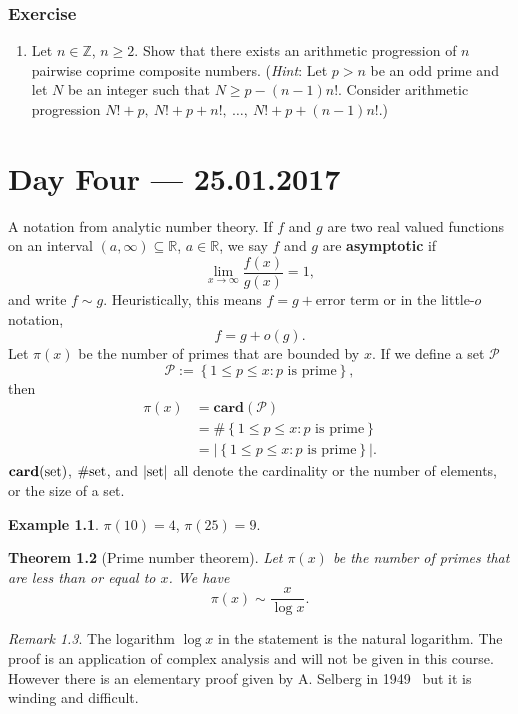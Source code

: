 \documentclass{amsbook}
\theoremstyle{plain}
\newtheorem{theorem}{Theorem}[chapter] %
\theoremstyle{definition}
\newtheorem{example}[theorem]{Example}
\theoremstyle{remark}
\newtheorem{remark}[theorem]{Remark}
\numberwithin{equation}{chapter}
\numberwithin{figure}{chapter}
\newcommand{\Z}{\mathbb{Z}}
\begin{document}
\subsection*{Exercise}
\begin{enumerate}
\item Let $n \in \Z$, $n \geqslant 2$. Show that there exists an arithmetic progression of $n$ pairwise coprime composite numbers. (\emph{Hint}: Let $p > n$ be an odd prime and let $N$ be an integer such that $N \geqslant p - (n-1)n!$. Consider arithmetic progression $N!+p, ~ N!+p+n!, ~\ldots, ~ N!+p+(n-1)n!$.)
\end{enumerate}

\chapter[Lecture Four]{Day Four \hfill {\footnotesize \rm --- 25.01.2017}}\label{chp:prime_num_theorem_gcd}

A notation from analytic number theory. If $f$ and $g$ are two real valued functions on an interval $(a, \infty) \subseteq \mathbb{R}$, $a \in \mathbb{R}$, we say $f$ and $g$ are \textbf{asymptotic} if 
\[
\lim_{x \to \infty} \frac{f(x)}{g(x)} = 1,
\]
and write $f \sim g$. Heuristically, this means $f = g + \text{error term}$ or in the little-$o$ notation,
\[
f = g + o (g).
\]
Let $\pi (x)$ be the number of primes that are bounded by $x$. If we define a set $\mathcal{P}$
\[
\mathcal{P} := \left\{ 1 \leqslant p \leqslant x : \text{$p$ is prime} \right\},
\]
then
\begin{align}
\pi (x) &= \mathbf{card}(\mathcal{P}) \\
        &= \# \left\{ 1 \leqslant p \leqslant x : \text{$p$ is prime} \right\} \\
        &= | \left\{ 1 \leqslant p \leqslant x : \text{$p$ is prime} \right\} |.
\end{align}
$\mathbf{card}(\rm{set})$, $\#\rm{set}$, and $|\rm{set}|$ all denote the cardinality or the number of elements, or the size of a set. 
\begin{example}
$\pi(10) = 4$, $\pi(25) = 9$.
\end{example}
\begin{theorem}[Prime number theorem] 
Let $\pi(x)$ be the number of primes that are less than or equal to $x$. We have
\[
\pi(x) \sim \frac{x}{\log x}.
\]
\end{theorem}
\begin{remark}
The logarithm $\log x$ in the statement is the natural logarithm. The proof is an application of complex analysis and will not be given in this course. However there is an elementary proof given by A. Selberg in 1949~\cite{Selberg1949} but it is winding and difficult.
\end{remark}
\end{document}
